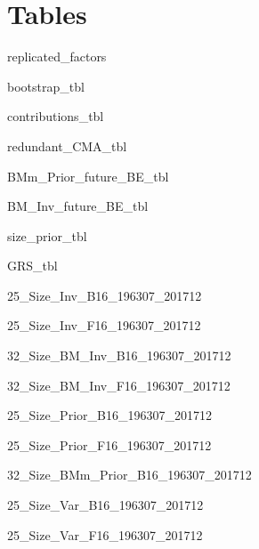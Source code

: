 
\section{Tables} \label{sec:tables}

{replicated_factors}

\begin{landscape}
{bootstrap_tbl}
\end{landscape}

{contributions_tbl}

{redundant_CMA_tbl}

{BMm_Prior_future_BE_tbl}

{BM_Inv_future_BE_tbl}

{size_prior_tbl}

{GRS_tbl}

{25_Size_Inv_B16_196307_201712}

{25_Size_Inv_F16_196307_201712}

\begin{landscape}
{32_Size_BM_Inv_B16_196307_201712}
\end{landscape}

\begin{landscape}
{32_Size_BM_Inv_F16_196307_201712}
\end{landscape}

{25_Size_Prior_B16_196307_201712}

{25_Size_Prior_F16_196307_201712}


\begin{landscape}
{32_Size_BMm_Prior_B16_196307_201712}
\end{landscape}

{25_Size_Var_B16_196307_201712}

{25_Size_Var_F16_196307_201712}

